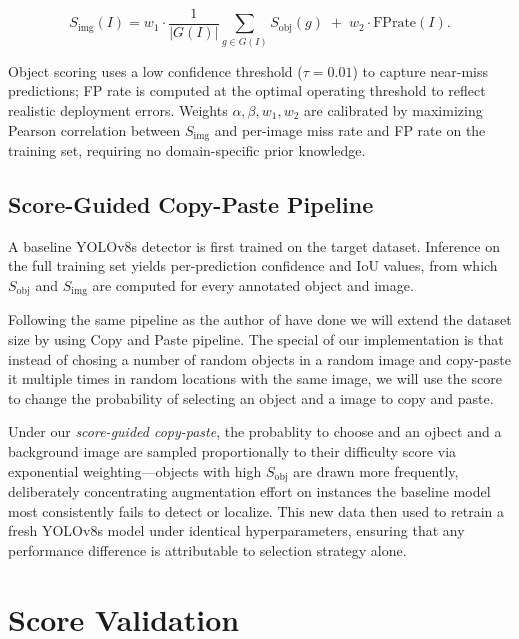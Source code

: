 \documentclass[conference]{IEEEtran}
\begin{document}
\begin{equation}
S_{\mathrm{img}}(I)
  = w_1 \cdot \frac{1}{|G(I)|}
    \sum_{g\in G(I)} S_{\mathrm{obj}}(g)
  \;+\; w_2 \cdot \mathrm{FPrate}(I).
\label{eq:img}
\end{equation}

Object scoring uses a low confidence threshold ($\tau{=}0.01$)
to capture near-miss predictions; FP rate is computed at the
optimal operating threshold to reflect realistic deployment errors.
Weights $\alpha, \beta, w_1, w_2$ are calibrated by maximizing
Pearson correlation between $S_{\mathrm{img}}$ and per-image miss
rate and FP rate on the training set, requiring no domain-specific
prior knowledge.

\subsection{Score-Guided Copy-Paste Pipeline}

A baseline YOLOv8s detector is first trained on the target dataset.
Inference on the full training set yields per-prediction confidence
and IoU values, from which $S_{\mathrm{obj}}$ and $S_{\mathrm{img}}$
are computed for every annotated object and image.

Following the same pipeline as the author of \cite{kisantal2019augmentation} 
have done we will extend the dataset size 
by using Copy and Paste pipeline.
The special of our implementation is that instead of 
chosing a number of random objects in a random image and copy-paste it
multiple times in random locations with the same image,
we will use the score to change the probability of selecting an object 
and a image to copy and paste.

Under our \emph{score-guided copy-paste}, the probablity to choose and 
an ojbect and a background image are sampled
proportionally to their difficulty score via exponential
weighting---objects with high $S_{\mathrm{obj}}$ are drawn
more frequently, deliberately concentrating augmentation effort on
instances the baseline model most consistently fails to detect or
localize.
This new data then used to retrain a fresh YOLOv8s model
under identical hyperparameters, ensuring that any performance
difference is attributable to selection strategy alone.

\section{Score Validation}
\label{sec:validation}
\end{document}
